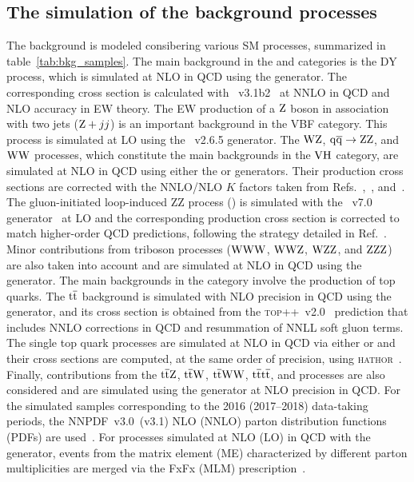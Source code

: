 \bigskip
\subsection{The simulation of the background processes}
The background is modeled consibering various SM processes, summarized in table~\ref{tab:bkg_samples}.
The main background in the \ggH and \qqH categories is the DY process, which is simulated at NLO in QCD using the \MGvATNLO generator. 
The corresponding cross section is calculated with \FEWZ~v3.1b2~\cite{Li:2012wna} at NNLO in QCD and NLO accuracy in EW theory. 
The EW production of a $\mathrm{Z}$ boson in association with two jets ($\mathrm{Z}+jj$) is an important background in the VBF category. 
This process is simulated at LO using the \MGvATNLO~v2.6.5 generator. 
The $\mathrm{W}\mathrm{Z}$, ${\mathrm{q}\overline{\mathrm{q}}\to\mathrm{Z}\mathrm{Z}}$, and $\mathrm{W}\mathrm{W}$ processes, which constitute the main backgrounds in the $\mathrm{V}\mathrm{H}$ category, 
are simulated at NLO in QCD using either the \POWHEG or \MGvATNLO generators. 
Their production cross sections are corrected with the NNLO/NLO $K$ factors taken from Refs.~\cite{Grazzini:2017ckn},~\cite{Grazzini:2015hta}, and~\cite{Gehrmann:2014fva}. 
The gluon-initiated loop-induced ZZ process (\ggZZ) is simulated with the \MCFM~v7.0 generator~\cite{Campbell:2011bn} at LO 
and the corresponding production cross section is corrected to match higher-order QCD predictions, following the strategy detailed in Ref.~\cite{Sirunyan:2017exp}. 
Minor contributions from triboson processes ($\mathrm{W}\mathrm{W}\mathrm{W}$, $\mathrm{W}\mathrm{W}\mathrm{Z}$, $\mathrm{W}\mathrm{Z}\mathrm{Z}$, and $\mathrm{Z}\mathrm{Z}\mathrm{Z}$) are also taken into account and are simulated at NLO in QCD using the \MGvATNLO generator. 
The main backgrounds in the \ttH category involve the production of top quarks. 
The $\mathrm{t}\overline{\mathrm{t}}$ background is simulated with NLO precision in QCD using the \POWHEG generator, and its cross section is obtained from the \textsc{top++}~v2.0~\cite{Czakon:2011xx} prediction 
that includes NNLO corrections in QCD and resummation of NNLL soft gluon terms. 
The single top quark processes are simulated at NLO in QCD via either \POWHEG or \MGvATNLO and their cross sections are computed, 
at the same order of precision, using \textsc{hathor}~\cite{Kant:2014oha}. 
Finally, contributions from the $\mathrm{t}\overline{\mathrm{t}}\mathrm{Z}$, $\mathrm{t}\overline{\mathrm{t}}\mathrm{W}$, $\mathrm{t}\overline{\mathrm{t}}\mathrm{W}\mathrm{W}$, ${\mathrm{t}\overline{\mathrm{t}}\mathrm{t}\overline{\mathrm{t}}}$, and \tZq processes 
are also considered and are simulated using the \MGvATNLO generator at NLO precision in QCD. 
For the simulated samples corresponding to the 2016 (2017--2018) data-taking periods, the NNPDF~v3.0~(v3.1) NLO (NNLO) parton distribution functions (PDFs) are used~\cite{Ball:2014uwa,Ball:2017nwa}. 
For processes simulated at NLO (LO) in QCD with the \MGvATNLO generator, events from the matrix element (ME) characterized by different parton multiplicities are merged via the FxFx (MLM) prescription~\cite{Alwall:2007fs,Frederix:2012ps}.


